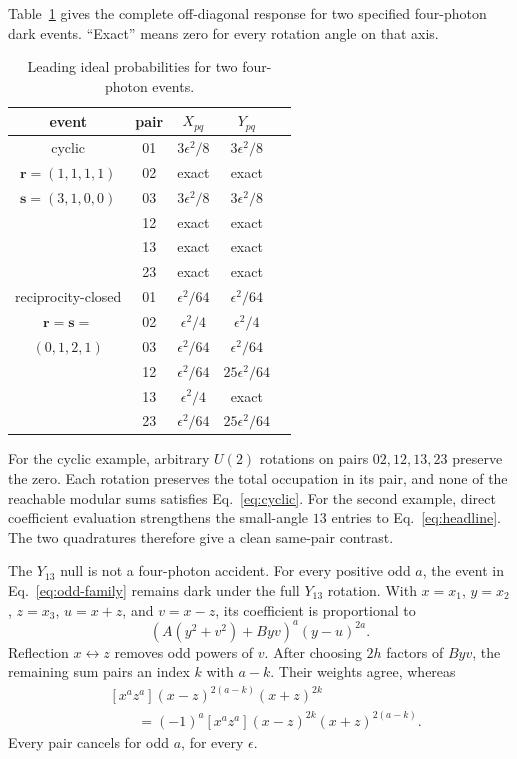 \documentclass[aps,pra,reprint,amsmath,amssymb,superscriptaddress,longbibliography]{revtex4-2}
\begin{document}
Table~\ref{tab:four-photon} gives the complete off-diagonal response for two
specified four-photon dark events.  ``Exact'' means zero for every rotation
angle on that axis.
\begin{table}[b]
\caption{Leading ideal probabilities for two four-photon events.}
\label{tab:four-photon}
\begin{ruledtabular}
\begin{tabular}{c c c c c}
event & pair & $X_{pq}$ & $Y_{pq}$\\
\hline
cyclic &01&$3\epsilon^2/8$&$3\epsilon^2/8$\\
$\bm r=(1,1,1,1)$&02&exact&exact\\
$\bm s=(3,1,0,0)$&03&$3\epsilon^2/8$&$3\epsilon^2/8$\\
&12&exact&exact\\
&13&exact&exact\\
&23&exact&exact\\[2pt]
\hline
reciprocity-closed&01&$\epsilon^2/64$&$\epsilon^2/64$\\
$\bm r=\bm s=$&02&$\epsilon^2/4$&$\epsilon^2/4$\\
$(0,1,2,1)$&03&$\epsilon^2/64$&$\epsilon^2/64$\\
&12&$\epsilon^2/64$&$25\epsilon^2/64$\\
&13&$\epsilon^2/4$&exact\\
&23&$\epsilon^2/64$&$25\epsilon^2/64$\\
\end{tabular}
\end{ruledtabular}
\end{table}

For the cyclic example, arbitrary $U(2)$ rotations on pairs
$02,12,13,23$ preserve the zero.  Each rotation preserves the total
occupation in its pair, and none of the reachable modular sums satisfies
Eq.~\eqref{eq:cyclic}.  For the second example, direct coefficient
evaluation strengthens the small-angle $13$ entries to Eq.~\eqref{eq:headline}.
The two quadratures therefore give a clean same-pair contrast.

The $Y_{13}$ null is not a four-photon accident.  For every positive odd
$a$, the event in Eq.~\eqref{eq:odd-family} remains dark under the full
$Y_{13}$ rotation.  With $x=x_1$, $y=x_2$, $z=x_3$, $u=x+z$, and
$v=x-z$, its coefficient is proportional to
\begin{equation}
[x^ay^{2a}z^a]
\left(A(y^2+v^2)+Byv\right)^a(y-u)^{2a}.
\label{eq:protected-coefficient}
\end{equation}
Reflection $x\leftrightarrow z$ removes odd powers of $v$.  After choosing
$2h$ factors of $Byv$, the remaining sum pairs an index $k$ with $a-k$.
Their weights agree, whereas
\begin{equation}
\begin{aligned}
&[x^az^a](x-z)^{2(a-k)}(x+z)^{2k}\\
&\qquad=(-1)^a[x^az^a](x-z)^{2k}(x+z)^{2(a-k)}.
\end{aligned}
\end{equation}
Every pair cancels for odd $a$, for every $\epsilon$.
\end{document}
